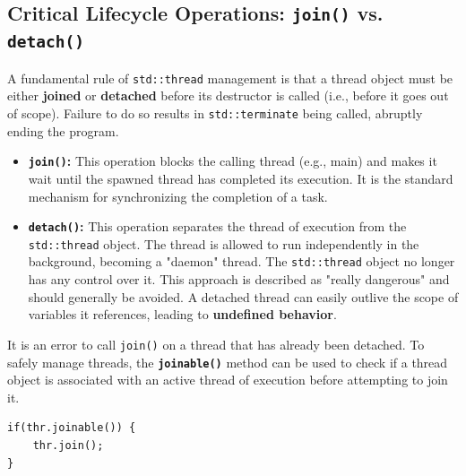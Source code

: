 \documentclass{article} %
\begin{document}
\subsection{Critical Lifecycle Operations: \texttt{join()} vs. \texttt{detach()}}
A fundamental rule of \texttt{std::thread} management is that a thread object must be either \textbf{joined} or \textbf{detached} before its destructor is called (i.e., before it goes out of scope). Failure to do so results in \texttt{std::terminate} being called, abruptly ending the program.
\begin{itemize}
    \item \textbf{\texttt{join()}:} This operation blocks the calling thread (e.g., main) and makes it wait until the spawned thread has completed its execution. It is the standard mechanism for synchronizing the completion of a task.
    \item \textbf{\texttt{detach()}:} This operation separates the thread of execution from the \texttt{std::thread} object. The thread is allowed to run independently in the background, becoming a "daemon" thread. The \texttt{std::thread} object no longer has any control over it. This approach is described as "really dangerous" and should generally be avoided. A detached thread can easily outlive the scope of variables it references, leading to \textbf{undefined behavior}.
\end{itemize}
It is an error to call \texttt{join()} on a thread that has already been detached. To safely manage threads, the \textbf{\texttt{joinable()}} method can be used to check if a thread object is associated with an active thread of execution before attempting to join it.
\begin{verbatim}
if(thr.joinable()) {
    thr.join();
}
\end{verbatim}
\end{document}
